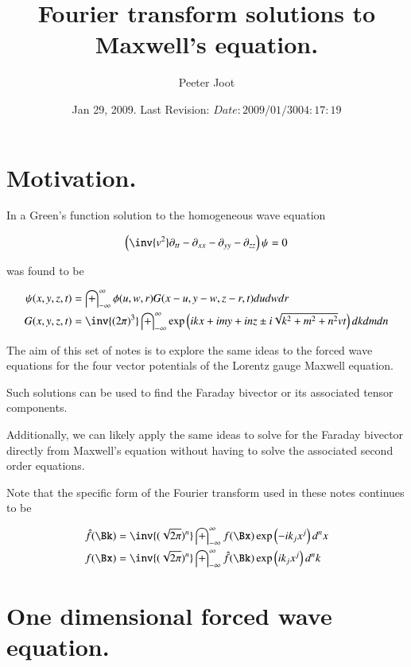 \documentclass{article}
\title{ Fourier transform solutions to Maxwell's equation. }
\author{Peeter Joot}
\date{ Jan 29, 2009.  Last Revision: $Date: 2009/01/30 04:17:19 $ }
\newcommand{\IIinf}[0]{ \int_{-\infty}^\infty }
\begin{document}
\maketitle{}

\tableofcontents
\section{ Motivation. }

In \cite{PJwaveFourier} a Green's function solution to the homogeneous 
wave equation

\begin{align}\label{eqn:wave}
\left(\inv{v^2} \partial_{tt} -\partial_{xx} -\partial_{yy} -\partial_{zz} \right)\psi = 0 
\end{align}

was found to be

\begin{align}\label{eqn:greensSolution3d}
{\psi}(x,y,z,t) &= \IIinf \phi(u,w,r) G( x-u, y-w, z-r, t) du dw dr \\
G(x,y,z,t) &= \inv{({2\pi})^3} \IIinf \exp\left( i k x + i m y + i n z \pm i \sqrt{k^2 + m^2 + n^2} v t \right) dk dm dn
\end{align}

The aim of this set of notes is to explore the same ideas to the forced wave
equations for the four vector potentials of the Lorentz gauge Maxwell equation.

Such solutions can be used to find the Faraday bivector or its associated
tensor components.

Additionally, we can likely apply the same ideas to solve for the Faraday
bivector directly from Maxwell's equation without having to solve the 
associated second order equations.

Note that the specific form of the Fourier transform used in these notes continues to be

\begin{align}
\hat{f}(\Bk) &= \inv{(\sqrt{2\pi})^n} \IIinf f(\Bx) \exp\left( -i k_j x^j \right) d^n x \\
{f}(\Bx) &= \inv{(\sqrt{2\pi})^n} \IIinf \hat{f}(\Bk) \exp\left( i k_j x^j \right) d^n k
\end{align}

\section{ One dimensional forced wave equation. }
\end{document}
